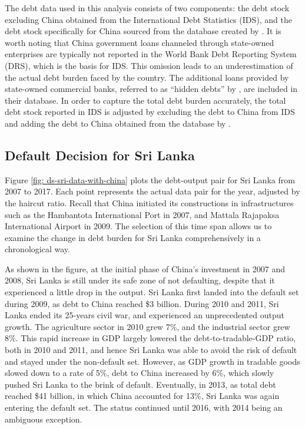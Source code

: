 The debt data used in this analysis consists of two components: the debt stock excluding China obtained from the International Debt Statistics (IDS), and the debt stock specifically for China sourced from the database created by \citet*{Horn-Reinhart-Trebesch-21}. It is worth noting that China government loans channeled through state-owned enterprises are typically not reported in the World Bank Debt Reporting System (DRS), which is the basis for IDS. This omission leads to an underestimation of the actual debt burden faced by the country. The additional loans provided by state-owned commercial banks, referred to as ``hidden debts'' by \citet*{Horn-Reinhart-Trebesch-21}, are included in their database. In order to capture the total debt burden accurately, the total debt stock reported in IDS is adjusted by excluding the debt to China from IDS and adding the debt to China obtained from the database by \citet*{Horn-Reinhart-Trebesch-21}.

\subsection{Default Decision for Sri Lanka}

Figure \ref{fig: ds-sri-data-with-china} plots the debt-output pair for Sri Lanka from 2007 to 2017. Each point represents the actual data pair for the year, adjusted by the haircut ratio. Recall that China initiated its constructions in infrastructures such as the Hambantota International Port in 2007, and Mattala Rajapaksa International Airport in 2009. The selection of this time span allows us to examine the change in debt burden for Sri Lanka comprehensively in a chronological way.

As shown in the figure, at the initial phase of China's investment in 2007 and 2008, Sri Lanka is still under its safe zone of not defaulting, despite that it experienced a little drop in the output. Sri Lanka first landed into the default set during 2009, as debt to China reached \$3 billion. During 2010 and 2011, Sri Lanka ended its 25-years civil war, and experienced an unprecedented output growth. The agriculture sector in 2010 grew 7\%, and the industrial sector grew 8\%. This rapid increase in GDP largely lowered the debt-to-tradable-GDP ratio, both in 2010 and 2011, and hence Sri Lanka was able to avoid the risk of default and stayed under the non-default set. However, as GDP growth in tradable goods slowed down to a rate of 5\%, debt to China increased by 6\%, which slowly pushed Sri Lanka to the brink of default. Eventually, in 2013, as total debt reached \$41 billion, in which China accounted for 13\%, Sri Lanka was again entering the default set. The status continued until 2016, with 2014 being an ambiguous exception.

